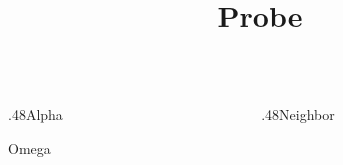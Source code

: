 \documentclass[11pt,aspectratio=169]{beamer}
\title{Probe}
\date{}
\begin{document}
\begin{frame}\begin{columns}[onlytextwidth]\begin{column}{.48\textwidth}Alpha\par {}\par Omega\end{column}\begin{column}{.48\textwidth}Neighbor\end{column}\end{columns}\end{frame}
\end{document}
